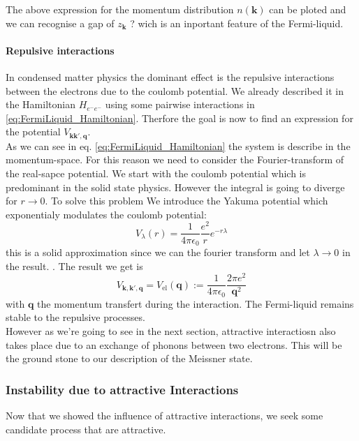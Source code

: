 \documentclass[../main.tex]{subfile}
\begin{document}
The above expression for the momentum distribution $n(\bm{k})$ can be ploted and we can recognise a gap of $z_{\bm{k}}$ ?
wich is an inportant feature of the Fermi-liquid.\\

\paragraph{Repulsive interactions}
In condensed matter physics the dominant effect is the repulsive interactions between the electrons due to the coulomb potential. We already described it in the Hamiltonian 
$H_{e^-e^-}$ using some pairwise interactions in \ref{eq:FermiLiquid_Hamiltonian}. Therfore the goal is now to find an expression for the potential $V_{\bm{k}\bm{k}',\bm{q}}$.\\

As we can see in eq. \ref{eq:FermiLiquid_Hamiltonian} the system is describe in the momentum-space. For this reason we need to 
consider the Fourier-transform of the real-sapce potential. We start with the coulomb potential which is predominant in the solid state physics.
However the integral is going to diverge for $r\rightarrow 0$. To solve this problem We
introduce the Yakuma potential which exponentialy modulates the coulomb potential:
\begin{equation}
    V_{\lambda}(r) = \frac{1}{4\pi\epsilon_0} \frac{e^2}{r} e^{-r\lambda} \label{eq:Yakuma}
\end{equation}
this is a solid approximation since we can the fourier transform and let $\lambda\rightarrow 0$ in the result. .
The result we get is 
\begin{equation} \label{eq:Pot_repulsive_el}
    V_{\bm{k},\bm{k}',\bm{q}} = V_{\text{el}}(\bm{q}) := \frac{1}{4\pi\epsilon_0} \frac{2\pi e^2}{\bm{q}^2}
\end{equation}
with $\bm{q}$ the momentum transfert during the interaction. The Fermi-liquid remains stable to the repulsive processes.\\

However as we're going to see in the next section, attractive interactiosn also takes place due to an exchange of phonons between two electrons. This will be the 
ground stone to our description of the Meissner state.

\subsubsection{Instability due to attractive Interactions}
Now that we showed the influence of attractive interactions, we seek some candidate process that are attractive.
\end{document}
